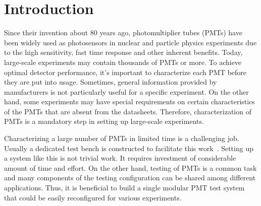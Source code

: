 \documentclass{nst}
\providecommand{\DIFadd}[1]{{\protect\color{yellow} \sf #1}} %
\providecommand{\DIFaddbegin}{} %
\providecommand{\DIFaddend}{} %
\providecommand{\DIFdelbegin}{} %
\providecommand{\DIFdelend}{} %
\begin{document}

\maketitle


\section{Introduction}
\label{sec:introduction}

Since \DIFdelbegin \DIFdelend \DIFaddbegin \DIFadd{their invention }\DIFaddend about 80 years ago, photomultiplier tubes (PMTs) have been widely used as photosensors in nuclear and particle physics experiments due to the high sensitivity, fast time response and other \DIFdelbegin \DIFdelend \DIFaddbegin \DIFadd{inherent benefits}\DIFaddend . 
Today, \DIFdelbegin \DIFdelend \DIFaddbegin \DIFadd{large-scale }\DIFaddend experiments may contain thousands \DIFdelbegin \DIFdelend \DIFaddbegin \DIFadd{of PMTs or more. To achieve optimal detector }\DIFaddend performance, it's important to \DIFdelbegin \DIFdelend \DIFaddbegin \DIFadd{characterize }\DIFaddend each PMT before they are put into usage. 
\DIFdelbegin \DIFdelend %
\DIFaddbegin \DIFadd{Sometimes, general information provided by manufacturers is not particularly useful for a specific }\DIFaddend experiment.
On the other hand, \DIFdelbegin \DIFdelend \DIFaddbegin \DIFadd{some }\DIFaddend experiments may have special requirements \DIFdelbegin \DIFdelend \DIFaddbegin \DIFadd{on certain }\DIFaddend characteristics of the PMTs \DIFdelbegin \DIFdelend \DIFaddbegin \DIFadd{that are absent from the datasheets}\DIFaddend . 
Therefore, \DIFdelbegin \DIFdelend characterization of PMTs \DIFdelbegin \DIFdelend \DIFaddbegin \DIFadd{is a mandatory step in setting up large-scale }\DIFaddend experiments.

Characterizing a large number of PMTs in limited time is a \DIFdelbegin \DIFdelend \DIFaddbegin \DIFadd{challenging job. Usually }\DIFaddend a dedicated test bench is constructed to facilitate this work~\cite{barnhill_testing_2008,akgun_complete_2005,adragna_pmt-block_2006}.
Setting up a system like this is not \DIFdelbegin \DIFdelend \DIFaddbegin \DIFadd{trivial work. It requires investment of considerable amount of }\DIFaddend time and effort.
On the other hand, testing of PMTs is a \DIFdelbegin \DIFdelend \DIFaddbegin \DIFadd{common task }\DIFaddend and many components of the testing configuration can be shared among different applications.
\DIFaddbegin \DIFadd{Thus, it is beneficial to build a single modular PMT test system that could be easily reconfigured for various experiments.
}\DIFaddend 
\end{document}
